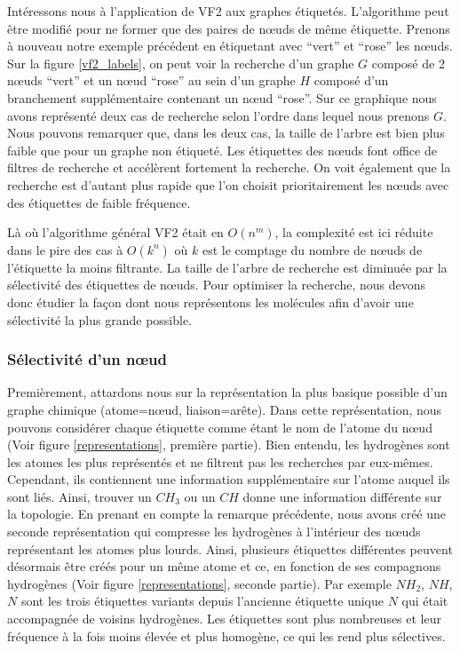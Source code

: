 Intéressons nous à l'application de VF2 aux graphes étiquetés.
L'algorithme peut être modifié pour ne former que des paires de n\oe{}uds de même étiquette.
Prenons à nouveau notre exemple précédent en étiquetant avec ``vert'' et ``rose'' les n\oe{}uds.
Sur la figure \ref{vf2_labels}, on peut voir la recherche d'un graphe $G$ composé de 2 n\oe{}uds ``vert'' et un n\oe{}ud ``rose'' au sein d'un graphe $H$ composé d'un branchement supplémentaire contenant un n\oe{}ud ``rose''.
Sur ce graphique nous avons représenté deux cas de recherche selon l'ordre dans lequel nous prenons $G$.
Nous pouvons remarquer que, dans les deux cas, la taille de l'arbre est bien plus faible que pour un graphe non étiqueté.
Les étiquettes des n\oe{}uds font office de filtres de recherche et accélèrent fortement la recherche.
On voit également que la recherche est d'autant plus rapide que l'on choisit prioritairement les n\oe{}uds avec des étiquettes de faible fréquence.

Là où l'algorithme général VF2 était en $O(n^m)$, la complexité est ici réduite dans le pire des cas à $O(k^n)$ où $k$ est le comptage du nombre de n\oe{}uds de l'étiquette la moins filtrante.
La taille de l'arbre de recherche est diminuée par la sélectivité des étiquettes de n\oe{}uds.
Pour optimiser la recherche, nous devons donc étudier la façon dont nous représentons les molécules afin d'avoir une sélectivité
la plus grande possible.

\subsubsection{Sélectivité d'un n\oe{}ud}

\label{selectiv_p}

Premièrement, attardons nous sur la représentation la plus basique possible d'un graphe chimique (atome=n\oe{}ud, liaison=arête).
Dans cette représentation, nous pouvons considérer chaque étiquette comme étant le nom de l'atome du n\oe{}ud (Voir figure \ref{representations}, première partie).
Bien entendu, les hydrogènes sont les atomes les plus représentés et ne filtrent pas les recherches par eux-mêmes.
Cependant, ils contiennent une information supplémentaire sur l'atome auquel ils sont liés.
Ainsi, trouver un $CH_{3}$ ou un $CH$ donne une information différente sur la topologie.
En prenant en compte la remarque précédente, nous avons créé une seconde représentation qui compresse les hydrogènes à l'intérieur des n\oe{}uds représentant les atomes plus lourds.
Ainsi, plusieurs étiquettes différentes peuvent désormais être créés pour un même atome et ce, en fonction de ses compagnons hydrogènes (Voir figure \ref{representations}, seconde partie).
Par exemple $NH_2$, $NH$, $N$ sont les trois étiquettes variants depuis l'ancienne étiquette unique $N$ qui était accompagnée de voisins hydrogènes.
Les étiquettes sont plus nombreuses et leur fréquence à la fois moins élevée et plus homogène, ce qui les rend plus sélectives.

